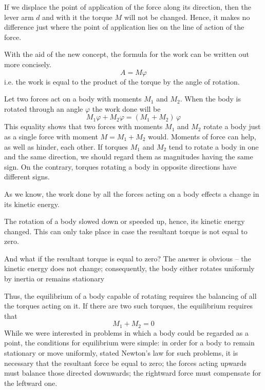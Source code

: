 If we displace the point of application of the force along its direction, then the lever arm $d$ and with it the torque
 $M$ will not be changed. Hence, it makes no difference just where the point of application lies on the line of
 action of the force.

With the aid of the new concept, the formula for the
work can be written out more concisely.
\begin{equation*}%
A = M \varphi 
\end{equation*}
i.e. the work is equal to the product of the torque by the angle of rotation.

Let two forces act on a body with moments $M_{1}$ and $M_{2}$.
When the body is rotated through an angle $\varphi$ the work done will be
\begin{equation*}%
M_{1}\varphi + M_{2}\varphi = (M_{1} + M_{2})\, \varphi
\end{equation*}
This equality shows that two forces with moments  $M_{1}$ and $M_{2}$ rotate a body just as a single force with moment $ M = M_{1} + M_{2}$ would. Moments of force can help, as well as hinder, each other. If torques  $M_{1}$ and $M_{2}$ tend to rotate a body in one and the same direction, we should regard them as magnitudes having the same sign. On the contrary, torques rotating a body in opposite directions have different signs.

As we know, the work done by all the forces acting on a body effects a change in its kinetic energy.

The rotation of a body slowed down or speeded up, hence, its kinetic energy changed. This can only take place in case the resultant torque is not equal to zero.

And what if the resultant torque is equal to zero? The answer is obvious -- the kinetic energy does not change; consequently, the body either rotates uniformly by inertia or remains stationary

Thus, the equilibrium of a body capable of rotating requires the balancing of all the torques acting on it. If there are two such torques, the equilibrium requires that
\begin{equation*}%
M_{1} + M_{2} = 0
\end{equation*}
While we were interested in problems in which a body could be regarded as a point, the conditions for equilibrium were simple: in order for a body to remain stationary or move uniformly, stated Newton's law for such problems, it is necessary that the resultant force be equal to zero; the forces acting upwards must balance those directed downwards; the rightward force must compensate for the leftward one.

